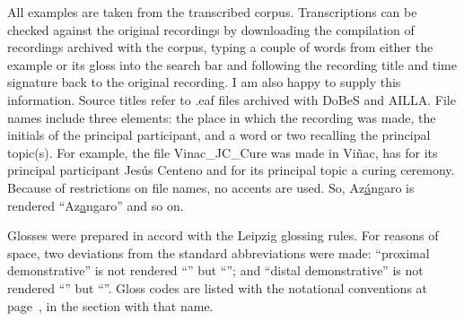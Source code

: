 \vspace{\baselineskip}
All examples are taken from the transcribed corpus. Transcriptions can be checked against the original recordings by downloading the compilation of recordings archived with the corpus, typing a couple of words from either the example or its gloss into the search bar and following the recording title and time signature back to the original recording. I am also happy to supply this information. Source titles refer to \textrm{.eaf} files archived with DoBeS and AILLA. File names include three elements: the place in which the recording was made, the initials of the principal participant, and a word or two recalling the principal topic(s). For example, the file \textrm{Vinac\_JC\_Cure} was made in Viñac, has for its principal participant Jesús Centeno and for its principal topic a curing ceremony. Because of restrictions on file names, no accents are used. So, Az\underline{á}ngaro is rendered “Az\underline{a}ngaro” and so on.

Glosses were prepared in accord with the Leipzig glossing rules. For reasons of space, two deviations from the standard abbreviations were made: “proximal demonstrative” is not rendered “” but “”; and “distal demonstrative” is not rendered “” but “”. Gloss codes are listed with the notational conventions at page~\pageref{ch:notconv}, in the section with that name.
